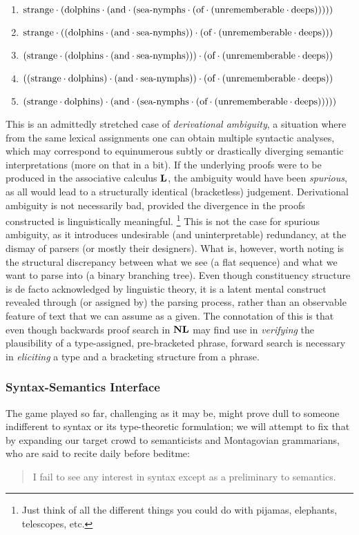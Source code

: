 {\smaller
\begin{enumerate}
\item $\text{strange}\cdot(\text{dolphins}\cdot(\text{and}\cdot(\text{sea-nymphs}\cdot(\text{of}\cdot(\text{unrememberable}\cdot\text{deeps})))))$
\item $\text{strange}\cdot((\text{dolphins}\cdot(\text{and}\cdot\text{sea-nymphs}))\cdot(\text{of}\cdot(\text{unrememberable}\cdot\text{deeps})))$
\item $(\text{strange}\cdot(\text{dolphins}\cdot(\text{and}\cdot\text{sea-nymphs})))\cdot(\text{of}\cdot(\text{unrememberable}\cdot\text{deeps}))$
\item $((\text{strange}\cdot\text{dolphins})\cdot(\text{and}\cdot\text{sea-nymphs}))\cdot(\text{of}\cdot(\text{unrememberable}\cdot\text{deeps}))$
\item $(\text{strange}\cdot\text{dolphins})\cdot(\text{and}\cdot(\text{sea-nymphs}\cdot(\text{of}\cdot(\text{unrememberable}\cdot\text{deeps})))))$
\end{enumerate}
}
This is an admittedly stretched case of \textit{derivational ambiguity}, a situation where from the same lexical assignments one can obtain multiple syntactic analyses, which may correspond to equinumerous subtly or drastically diverging semantic interpretations (more on that in a bit).
If the underlying proofs were to be produced in the associative calculus $\textbf{L}$, the ambiguity would have been \textit{spurious}, as all would lead to a structurally identical (bracketless) judgement.
Derivational ambiguity is not necessarily bad, provided the divergence in the proofs constructed is linguistically meaningful.%
\footnote{Just think of all the different things you could do with pijamas, elephants, telescopes, etc.}
This is not the case for spurious ambiguity, as it introduces undesirable (and uninterpretable) redundancy, at the dismay of parsers (or mostly their designers).
What is, however, worth noting is the structural discrepancy between what we see (a flat sequence) and what we want to parse into (a binary branching tree).
Even though constituency structure is de facto acknowledged by linguistic theory, it is a latent mental construct revealed through (or assigned by) the parsing process, rather than an observable feature of text that we can assume as a given.
The connotation of this is that even though backwards proof search in $\textbf{NL}$ may find use in \textit{verifying} the plausibility of a type-assigned, pre-bracketed phrase, forward search is necessary in \textit{eliciting} a type and a bracketing structure from a phrase. 

\subsubsection{Syntax-Semantics Interface}
The game played so far, challenging as it may be, might prove dull to someone indifferent to syntax or its type-theoretic formulation; we will attempt to fix that by expanding our target crowd to semanticists and Montagovian grammarians, who are said to recite daily before beditme:
\begin{quote}
I fail to see any interest in syntax except as a preliminary to semantics.~\cite{montague1970universal}
\end{quote}

